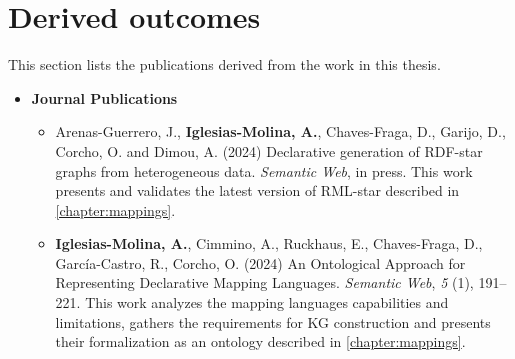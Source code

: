 \section{Derived outcomes}

This section lists the publications derived from the work in this thesis.


\begin{itemize}
    \item \textbf{Journal Publications}
    \begin{itemize}
        \item Arenas-Guerrero, J., \textbf{Iglesias-Molina, A.}, Chaves-Fraga, D., Garijo, D., Corcho, O. and Dimou, A. (2024) Declarative generation of RDF-star graphs from heterogeneous data. \textit{Semantic Web}, in press. This work presents and validates the latest version of RML-star described in \cref{chapter:mappings}.
        
        \item \textbf{Iglesias-Molina, A.}, Cimmino, A., Ruckhaus, E., Chaves-Fraga, D., García-Castro, R., Corcho, O. (2024) An Ontological Approach for Representing Declarative Mapping Languages. \textit{Semantic Web}, \textit{5} (1), 191–221. This work analyzes the mapping languages capabilities and limitations, gathers the requirements for KG construction and presents their formalization as an ontology described in \cref{chapter:mappings}.
    \end{itemize}
\end{itemize}




